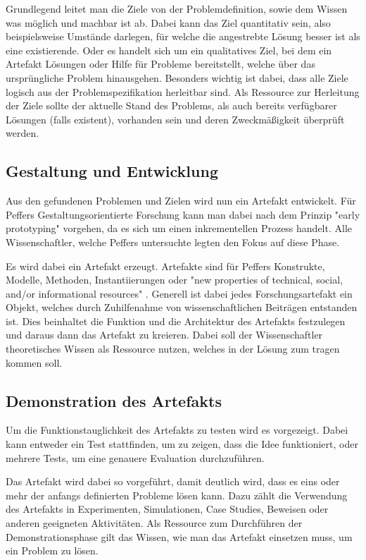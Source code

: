 Grundlegend leitet man die Ziele von der Problemdefinition, sowie dem Wissen was möglich und machbar ist ab. Dabei kann das Ziel quantitativ sein, also beispielsweise Umstände darlegen, für welche die angestrebte Lösung besser ist als eine existierende. Oder es handelt sich um ein qualitatives Ziel, bei dem ein Artefakt Lösungen oder Hilfe für Probleme bereitstellt, welche über das ursprüngliche Problem hinausgehen. Besonders wichtig ist dabei, dass alle Ziele logisch aus der Problemspezifikation herleitbar sind. Als Ressource zur Herleitung der Ziele sollte der aktuelle Stand des Problems, als auch bereits verfügbarer Lösungen (falls existent), vorhanden sein und deren Zweckmäßigkeit überprüft werden.

\subsection{Gestaltung und Entwicklung}

Aus den gefundenen Problemen und Zielen wird nun ein Artefakt entwickelt. Für Peffers Gestaltungsorientierte Forschung kann man dabei nach dem Prinzip "early prototyping" vorgehen, da es sich um einen inkrementellen Prozess handelt. Alle Wissenschaftler, welche Peffers untersuchte legten den Fokus auf diese Phase.

Es wird dabei ein Artefakt erzeugt. Artefakte sind für Peffers Konstrukte, Modelle, Methoden, Instantiierungen oder "new properties of technical, social, and/or informational resources" \cite{jarvinen_action_2007}. Generell ist dabei jedes Forschungsartefakt ein Objekt, welches durch Zuhilfenahme von wissenschaftlichen Beiträgen entstanden ist. Dies beinhaltet die Funktion und die Architektur des Artefakts festzulegen und daraus dann das Artefakt zu kreieren. Dabei soll der Wissenschaftler theoretisches Wissen als Ressource nutzen, welches in der Lösung zum tragen kommen soll.

\subsection{Demonstration des Artefakts}

Um die Funktionstauglichkeit des Artefakts zu testen wird es vorgezeigt. Dabei kann entweder ein Test stattfinden, um zu zeigen, dass die Idee funktioniert, oder mehrere Tests, um eine genauere Evaluation durchzuführen.

Das Artefakt wird dabei so vorgeführt, damit deutlich wird, dass es eins oder mehr der anfangs definierten Probleme lösen kann. Dazu zählt die Verwendung des Artefakts in Experimenten, Simulationen, Case Studies, Beweisen oder anderen geeigneten Aktivitäten. Als Ressource zum Durchführen der Demonstrationsphase gilt das Wissen, wie man das Artefakt einsetzen muss, um ein Problem zu lösen.

